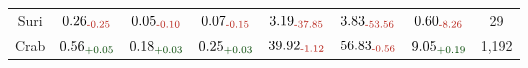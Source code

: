 \begin{table*}[!ht]
{\begin{tabular}{c|ccc|cc|cc}
Suri & $\text{0.26}_{\textcolor{deepred}{\text{-0.25}}}$ & $\text{0.05}_{\textcolor{deepred}{\text{-0.10}}}$ & $\text{0.07}_{\textcolor{deepred}{\text{-0.15}}}$ & $\text{3.19}_{\textcolor{deepred}{\text{-37.85}}}$ & $\text{3.83}_{\textcolor{deepred}{\text{-53.56}}}$ & $\text{0.60}_{\textcolor{deepred}{\text{-8.26}}}$ &  29         \\
Crab & $\text{0.56}_{\textcolor{deepgreen}{\text{+0.05}}}$ & $\text{0.18}_{\textcolor{deepgreen}{\text{+0.03}}}$ & $\text{0.25}_{\textcolor{deepgreen}{\text{+0.03}}}$ & $\text{39.92}_{\textcolor{deepred}{\text{-1.12}}}$ & $\text{56.83}_{\textcolor{deepred}{\text{-0.56}}}$ & $\text{9.05}_{\textcolor{deepgreen}{\text{+0.19}}}$ &  1,192                 \\


\end{tabular}}
\end{table*}
